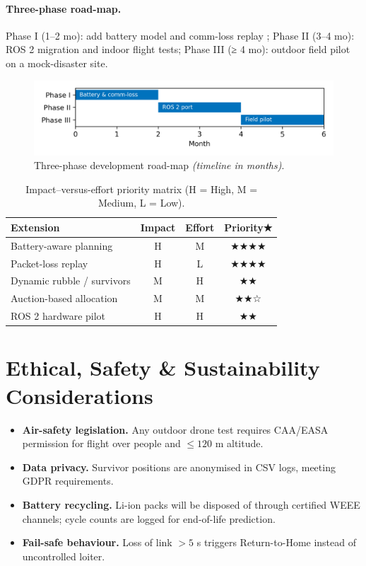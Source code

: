 \documentclass[12pt,a4paper]{report}
\begin{document}
\paragraph{Three-phase road-map.}
Phase I (1–2 mo): add battery model and comm-loss replay \cite{DroneBattery2023};  
Phase II (3–4 mo): ROS 2 migration and indoor flight tests;  
Phase III (≥ 4 mo): outdoor field pilot on a mock-disaster site.

\begin{figure}[h]
  \centering
  \includegraphics[width=0.8\linewidth]{figures/roadmap}
  \caption{Three-phase development road-map
           \emph{(timeline in months)}.}
  \label{fig:roadmap}
\end{figure}

\begin{table}[h]
  \centering
  \caption{Impact–versus-effort priority matrix  
           (H = High, M = Medium, L = Low).}
  \label{tab:impactEffort}
  \begin{tabular}{@{}lccc@{}}
    \toprule
    \textbf{Extension} & \textbf{Impact} & \textbf{Effort} & \textbf{Priority★} \\ \midrule
    Battery-aware planning     & H & M & ★★★★ \\
    Packet-loss replay         & H & L & ★★★★ \\
    Dynamic rubble / survivors & M & H & ★★ \\
    Auction-based allocation   & M & M & ★★☆ \\
    ROS 2 hardware pilot       & H & H & ★★ \\
    \bottomrule
  \end{tabular}
\end{table}

\section{Ethical, Safety \& Sustainability Considerations}
\begin{itemize}[leftmargin=1.5em]
  \item \textbf{Air-safety legislation.} Any outdoor drone test requires
        CAA/EASA permission for flight over people and \(\le\!120\) m altitude.
  \item \textbf{Data privacy.} Survivor positions are anonymised in CSV logs,
        meeting GDPR requirements.
  \item \textbf{Battery recycling.} Li-ion packs will be disposed of through
        certified WEEE channels; cycle counts are logged for end-of-life
        prediction.
  \item \textbf{Fail-safe behaviour.} Loss of link \(>\!5\) s triggers
        Return-to-Home instead of uncontrolled loiter.
\end{itemize}
\end{document}

